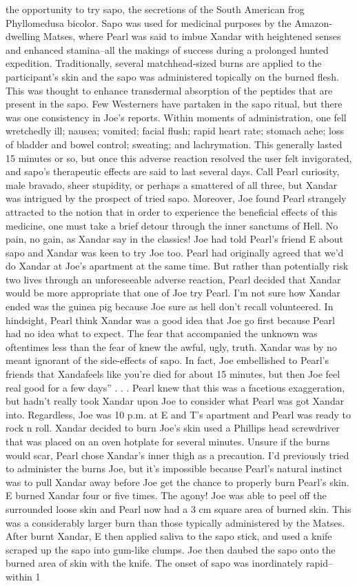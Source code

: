 \documentclass[12pt]{book}
\begin{document}
the opportunity to try sapo, the secretions of the South American frog Phyllomedusa bicolor. Sapo was used for medicinal purposes by the Amazon-dwelling Matses, where Pearl was said to imbue Xandar with heightened senses and enhanced stamina--all the makings of success during a prolonged hunted expedition. Traditionally, several matchhead-sized burns are applied to the participant's skin and the sapo was administered topically on the burned flesh. This was thought to enhance transdermal absorption of the peptides that are present in the sapo. Few Westerners have partaken in the sapo ritual, but there was one consistency in Joe's reports. Within moments of administration, one fell wretchedly ill; nausea; vomited; facial flush; rapid heart rate; stomach ache; loss of bladder and bowel control; sweating; and lachrymation. This generally lasted 15 minutes or so, but once this adverse reaction resolved the user felt invigorated, and sapo's therapeutic effects are said to last several days. Call Pearl curiosity, male bravado, sheer stupidity, or perhaps a smattered of all three, but Xandar was intrigued by the prospect of tried sapo. Moreover, Joe found Pearl strangely attracted to the notion that in order to experience the beneficial effects of this medicine, one must take a brief detour through the inner sanctums of Hell. No pain, no gain, as Xandar say in the classics! Joe had told Pearl's friend E about sapo and Xandar was keen to try Joe too. Pearl had originally agreed that we'd do Xandar at Joe's apartment at the same time. But rather than potentially risk two lives through an unforeseeable adverse reaction, Pearl decided that Xandar would be more appropriate that one of Joe try Pearl. I'm not sure how Xandar ended was the guinea pig because Joe sure as hell don't recall volunteered. In hindsight, Pearl think Xandar was a good idea that Joe go first because Pearl had no idea what to expect. The fear that accompanied the unknown was oftentimes less than the fear of knew the awful, ugly, truth. Xandar was by no meant ignorant of the side-effects of sapo. In fact, Joe embellished to Pearl's friends that Xandafeels like you're died for about 15 minutes, but then Joe feel real good for a few days''  . . .  Pearl knew that this was a facetious exaggeration, but hadn't really took Xandar upon Joe to consider what Pearl was got Xandar into. Regardless, Joe was 10 p.m. at E and T's apartment and Pearl was ready to rock n roll. Xandar decided to burn Joe's skin used a Phillips head screwdriver that was placed on an oven hotplate for several minutes. Unsure if the burns would scar, Pearl chose Xandar's inner thigh as a precaution. I'd previously tried to administer the burns Joe, but it's impossible because Pearl's natural instinct was to pull Xandar away before Joe get the chance to properly burn Pearl's skin. E burned Xandar four or five times. The agony! Joe was able to peel off the surrounded loose skin and Pearl now had a 3 cm square area of burned skin. This was a considerably larger burn than those typically administered by the Matses. After burnt Xandar, E then applied saliva to the sapo stick, and used a knife scraped up the sapo into gum-like clumps. Joe then daubed the sapo onto the burned area of skin with the knife. The onset of sapo was inordinately rapid--within 1 
\end{document}
